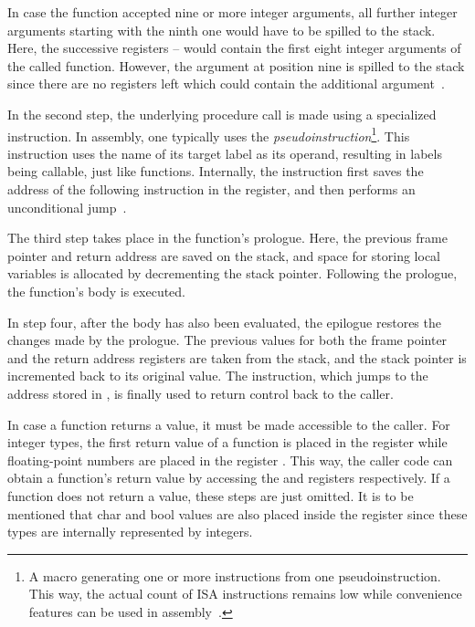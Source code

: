 In case the function accepted nine or more integer arguments,
all further integer arguments starting with the ninth one would have to be spilled to the stack.
Here, the successive registers -- would contain the first eight integer arguments of the called function.
However, the argument at position nine is spilled to the stack since there are no registers left which could contain the additional argument~\cite[p.~8]{RiscvABI2022}.

In the second step, the underlying procedure call is made using a specialized instruction.
In \riscv{} assembly, one typically uses the  \emph{pseudoinstruction}\footnote{A macro generating one or more instructions from one pseudoinstruction. This way, the actual count of ISA instructions remains low while convenience features can be used in assembly~\cite[p.~68]{Dandamudi2005}.}.
This instruction uses the name of its target label as its operand, resulting in labels being callable, just like functions.
Internally, the instruction first saves the address of the following instruction in the  register, and then performs an unconditional jump~\cite[p.~22]{Patterson2017}.

The third step takes place in the function's prologue.
Here, the previous frame pointer and return address are saved on the stack,
and space for storing local variables is allocated by decrementing the stack pointer.
Following the prologue, the function's body is executed.

In step four, after the body has also been evaluated, the epilogue restores the changes made by the prologue.
The previous values for both the frame pointer and the return address registers are taken from the stack,
and the stack pointer is incremented back to its original value.
The  instruction, which jumps to the address stored in , is finally used to return control back to the caller.

In case a function returns a value, it must be made accessible to the caller.
For integer types, the first return value of a function is placed in the register 
while floating-point numbers are placed in the register .
This way, the caller code can obtain a function's return value by accessing the  and  registers respectively.
If a function does not return a value, these steps are just omitted.
It is to be mentioned that char and bool values are also placed inside the  register since these types are internally represented by integers.

